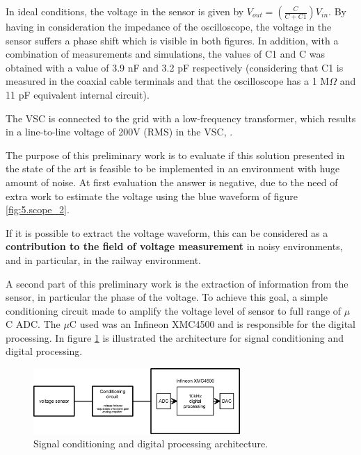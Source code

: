 	In ideal conditions, the voltage in the sensor is given by $V_{out} = (\frac{C}{C+C1})  V_{in} $.
	By having in consideration the impedance of the oscilloscope, the voltage in the sensor suffers a phase shift which is visible in both figures.
	In addition, with a combination of measurements and simulations, the values of C1 and C was obtained with a value of 3.9 nF and 3.2 pF respectively (considering that C1 is measured in the coaxial cable terminals and that the oscilloscope has a 1 M$\Omega$ and 11 pF equivalent internal circuit). 
	
	The \ac{VSC} is connected to the grid with a low-frequency transformer, which results in a line-to-line voltage of 200V (RMS) in the \ac{VSC}, \cite{martins2016}.

	The purpose of this preliminary work is to evaluate if this solution presented in the state of the art is feasible to be implemented in an environment with huge amount of noise. At first evaluation the answer is negative, due to the need of extra work to estimate the voltage using the blue waveform of figure \ref{fig:5.scope_2}.
	
	
	If it is possible to extract the voltage waveform, this can be considered as a \textbf{contribution to the field of voltage measurement} in noisy environments, and in particular, in the railway environment.

	A second part of this preliminary work is the extraction of information from the sensor, in particular the phase of the voltage. To achieve this goal, a simple conditioning circuit made to amplify the voltage level of sensor to full range of $\mu$C ADC. The $\mu$C used was an Infineon XMC4500 and is responsible for the digital processing. In figure \ref{fig:5.generalArchitecture} is illustrated the architecture for signal conditioning and digital processing.
	
	\begin{figure}[h!]
		\centering
		\includegraphics[width=0.7\textwidth,keepaspectratio]{figures/50.PreliminaryW/generalArchitecture}
		\caption{Signal conditioning and digital processing architecture.}
		\label{fig:5.generalArchitecture}
	\end{figure}

